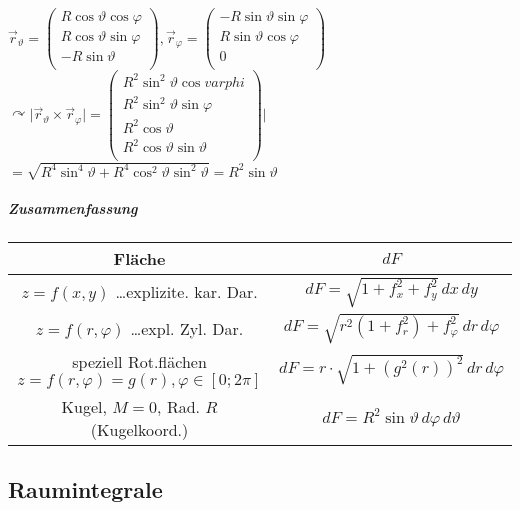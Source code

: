 \documentclass[a4paper]{scrartcl}
\begin{document}
\begin{itemize}
$\vec{r}_\vartheta = \begin{pmatrix} R \cos{\vartheta} \cos{\varphi} \\ R \cos{\vartheta} \sin{\varphi} \\ -R \sin{\vartheta} \\ \end{pmatrix} , \vec{r}_\varphi = \begin{pmatrix} - R \sin{\vartheta} \sin{\varphi} \\ R \sin{\vartheta} \cos{\varphi} \\ 0 \\ \end{pmatrix}$\\
$\curvearrowright \lvert \vec{r}_\vartheta \times \vec{r}_\varphi \rvert = \begin{pmatrix} R^2 \sin^2{\vartheta} \cos{varphi} \\ R^2 \sin^2{\vartheta} \sin{\varphi} \\ R^2 \cos{\vartheta} \\ R^2 \cos{\vartheta} \sin{\vartheta} \\ \end{pmatrix} \rvert$\\
$= \sqrt{R^4 \sin^4{\vartheta} + R^4 \cos^2{\vartheta} \sin^2{\vartheta}} = R^2 \sin{\vartheta}$
\end{itemize}

\subparagraph{Zusammenfassung}
\begin{tabular}{|c|c|} \hline
Fläche & $dF$ \\ \hline
$z=f(x,y)$ \dots explizite. kar. Dar. & $dF = \sqrt{1 + f_x^2 + f_y^2} \, dx \, dy$\\ \hline
$z=f(r,\varphi)$ \dots expl. Zyl. Dar. & $dF= \sqrt{r^2 (1 + f_r^2) + f_\varphi^2} \, dr \, d\varphi$\\
speziell Rot.flächen $z=f(r,\varphi) = g(r), \varphi \in [0;2\pi]$ & $dF = r \cdot \sqrt{1 + (g^2(r))^2} \, dr \, d\varphi$\\ \hline
Kugel, $M=0$, Rad. $R$ (Kugelkoord.) & $dF = R^2 \sin{\vartheta} \, d\varphi \, d\vartheta$ \\ \hline
\end{tabular}

\subsection{Raumintegrale}
\end{document}

